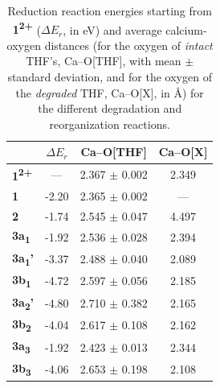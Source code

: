 \documentclass[twoside,twocolumn,9pt]{article}
\begin{document}
{\begin{table}
	\centering
	\begin{tabular}{>{\bfseries}lccc}
		\hline
		& $\Delta E_r$ & Ca--O[THF] & Ca--O[X] \\
		\hline
		 1\textsuperscript{2+}&  --- & 2.367 $\pm$ 0.002 & 2.349 \\
		 \hline
		1 & -2.20 & 2.365 $\pm$ 0.002 & --- \\
		2 & -1.74 & 2.545 $\pm$ 0.047 & 4.497 \\
		3a\textsubscript{1} & -1.92 & 2.536 $\pm$ 0.028 & 2.394 \\
		3a\textsubscript{1}' & -3.37 & 2.488 $\pm$ 0.040 & 2.089 \\
		3b\textsubscript{1} & -4.72 & 2.597 $\pm$ 0.056 & 2.185 \\
		3a\textsubscript{2}' & -4.80 & 2.710 $\pm$ 0.382 & 2.165 \\
		3b\textsubscript{2} & -4.04 & 2.617 $\pm$ 0.108 & 2.162 \\
		3a\textsubscript{3} & -1.92 & 2.423 $\pm$ 0.013 & 2.344 \\
		3b\textsubscript{3} & -4.06 & 2.653 $\pm$ 0.198 & 2.108 \\
		\hline
	\end{tabular}
	\caption{Reduction reaction energies starting from \textbf{1\textsuperscript{2+}} ($\Delta E_r$, in \si{\electronvolt}) and average calcium-oxygen distances (for the oxygen of \textit{intact} THF's, Ca--O[THF], with mean $\pm$ standard deviation, and for the oxygen of the \textit{degraded} THF, Ca--O[X], in \si{\angstrom}) for the different degradation and reorganization reactions.}
	\label{tab:degrad}
\end{table}

}
\end{document}
